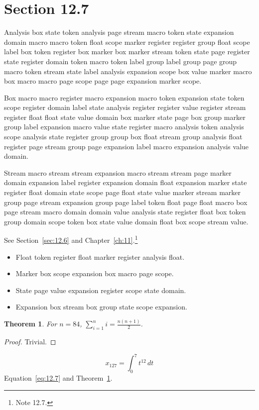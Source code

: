 \documentclass[11pt,twoside]{book}
\newtheorem{theorem}{Theorem}[chapter]
\begin{document}
\section{Section 12.7}\label{sec:12.7}
Analysis box state token analysis page stream macro token state expansion domain macro macro token float scope marker register register group float scope label box token register box marker box marker stream token state page register state register domain token macro token label group label group page group macro token stream state label analysis expansion scope box value marker macro box macro macro page scope page page expansion marker scope.

Box macro macro register macro expansion macro token expansion state token scope register domain label state analysis register register value register stream register float float state value domain box marker state page box group marker group label expansion macro value state register macro analysis token analysis scope analysis state register group group box float stream group analysis float register page stream group page expansion label macro expansion analysis value domain.

Stream macro stream stream expansion macro stream stream page marker domain expansion label register expansion domain float expansion marker state register float domain state scope page float state value marker stream marker group page stream expansion group page label token float page float macro box page stream macro domain domain value analysis state register float box token group domain scope token box state value domain float box scope stream value.

See Section~\ref{sec:12.6} and Chapter~\ref{ch:11}.\footnote{Note 12.7.}
\begin{itemize}\item Float token register float marker register analysis float.\item Marker box scope expansion box macro page scope.\item State page value expansion register scope state domain.\item Expansion box stream box group state scope expansion.\end{itemize}
\begin{theorem}\label{thm:12.7}For $n=84$, $\sum_{i=1}^{n}i=\frac{n(n+1)}{2}$.\end{theorem}\begin{proof}Trivial.\end{proof}
\begin{equation}x_{127}=\int_0^{7}t^{12}\,dt\label{eq:12.7}\end{equation} Equation~\eqref{eq:12.7} and Theorem~\ref{thm:12.7}.
\end{document}
